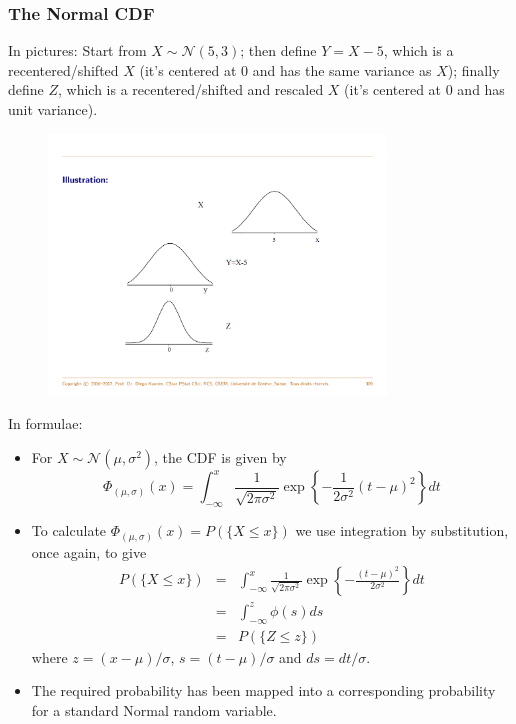\documentclass[notes=show,smaller,handout]{beamer}\usepackage[]{graphicx}\usepackage[]{color}
\renewcommand{\Pr}{P}
\newcommand{\N}{\mathcal{N}}
\newenvironment{stepitemize}{\begin{itemize}[<+->]}{\end{itemize} }
\begin{document}
\begin{frame}{\subsecname}
\frametitle{The Normal CDF}
In pictures:
Start from $X \sim \mathcal{N}(5,3)$; then define $Y=X-5$, which is a recentered/shifted $X$ (it's centered at 0 and has the same variance as $X$); finally define $Z$, which is a recentered/shifted and rescaled $X$ (it's centered at 0 and has unit variance).

\begin{figure}[ptb]\centering
\includegraphics[width=0.8\textwidth,height=0.65\textheight]{img/Std_Diego.pdf}%
\end{figure}%



\end{frame}

\begin{frame}{\subsecname}

In formulae:
\begin{stepitemize}
\item For $X\sim \N\left( \mu ,\sigma ^{2}\right) $, the CDF is given by%
$$
\Phi_{(\mu,\sigma)}\left( x\right) =\int_{-\infty }^{x}\frac{1}{\sqrt{2\pi \sigma ^{2}}}\exp{ \left\{ -\frac{1}{2\sigma ^{2}}\left( t-\mu \right) ^{2}\right\}} dt
$$
\item To calculate $\Phi_{(\mu,\sigma)}\left( x\right)=\Pr(\{X\leq x\})$ we use integration by substitution, once again, to give
\begin{eqnarray*}
\Pr(\{ X\leq x\} )&=&\int_{-\infty}^x\frac{1}{\sqrt{2\pi\sigma^2}}\exp{\left\{-\frac{(t-\mu)^2}{2\sigma^2}\right\}}dt\\
 &=&\int_{-\infty}^z\phi(s)ds\\
  &=&P(\{Z\leq z\})
\end{eqnarray*}
where $z=(x-\mu)/\sigma$, $s=(t-\mu)/\sigma$ and $ds=dt/\sigma$.
\item The required probability has been mapped into a corresponding probability for a standard Normal random variable.
\end{stepitemize}

\end{frame}%
\end{document}
